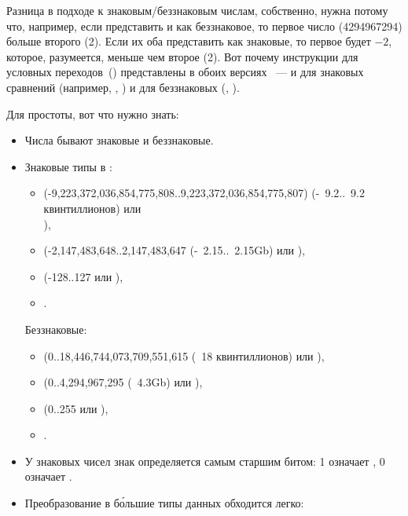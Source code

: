 Разница в подходе к знаковым/беззнаковым числам, собственно, нужна потому что, например, 
если представить  и  как беззнаковое, то первое число (4294967294) больше второго (2). 
Если их оба представить как знаковые, то первое будет $-2$, которое, разумеется, меньше чем второе (2).
Вот почему инструкции для условных переходов~() представлены в обоих версиях ~--- 
и для знаковых сравнений (например, \JG, \JL) и для беззнаковых (\JA, \JB).

Для простоты, вот что нужно знать:

\begin{itemize}
\item Числа бывают знаковые и беззнаковые.

\item Знаковые типы в \CCpp:

  \begin{itemize}
    \item {} (-9,223,372,036,854,775,808..9,223,372,036,854,775,807) 
	  (-~9.2..~9.2 квинтиллионов) или \\
                ),
    \item \Tint (-2,147,483,648..2,147,483,647 (-~2.15..~2.15Gb) или ),
    \item \Tchar (-128..127 или ),
    \item {}.
   \end{itemize}

	Беззнаковые:
  \begin{itemize}
	  \item {} (0..18,446,744,073,709,551,615 
		  (~18 квинтиллионов) или ),
   \item {} (0..4,294,967,295 (~4.3Gb) или ),
   \item {} (0..255 или ), 
   \item {}.
  \end{itemize}

\item У знаковых чисел знак определяется самым старшим битом: 1 означает , 0 означает .

\item Преобразование в б\'{о}льшие типы данных обходится легко:


\end{itemize}
